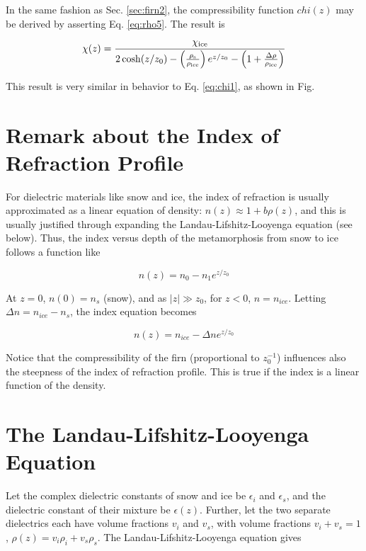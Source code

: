 \documentclass[12pt]{article}
\begin{document}
In the same fashion as Sec. \ref{sec:firn2}, the compressibility function $chi(z)$ may be derived by asserting Eq. \ref{eq:rho5}.  The result is

\begin{equation}
\chi(z) = \frac{\chi_{\rm ice}}{ 2\cosh(z/z_0) - \left(\frac{\rho_{\rm s}}{\rho_{\rm ice}}\right) e^{z/z_0} - \left(1+\frac{\Delta\rho}{\rho_{\rm ice}}\right)  }
\label{eq:chi4}
\end{equation}

This result is very similar in behavior to Eq. \ref{eq:chi1}, as shown in Fig.

\section{Remark about the Index of Refraction Profile}

For dielectric materials like snow and ice, the index of refraction is usually approximated as a linear equation of density: $n(z) \approx 1+b\rho(z)$, and this is usually justified through expanding the Landau-Lifshitz-Looyenga equation (see below).  Thus, the index versus depth of the metamorphosis from snow to ice follows a function like

\begin{equation}
n(z) = n_{0} - n_1 e^{z/z_0}
\end{equation}

At $z=0$, $n(0) = n_s$ (snow), and as $|z| \gg z_0$, for $z<0$, $n = n_{ice}$.  Letting $\Delta n = n_{ice} - n_{s}$, the index equation becomes

\begin{equation}
\boxed{
n(z) = n_{ice} - \Delta n e^{z/z_0}
}
\label{eq:n}
\end{equation}

Notice that the compressibility of the firn (proportional to $z_0^{-1}$) influences also the steepness of the index of refraction profile.  This is true if the index is a linear function of the density.

\section{The Landau-Lifshitz-Looyenga Equation}

Let the complex dielectric constants of snow and ice be $\epsilon_i$ and $\epsilon_s$, and the dielectric constant of their mixture be $\epsilon(z)$. Further, let the two separate dielectrics each have volume fractions $v_i$ and $v_s$, with volume fractions $v_i + v_s = 1$, $\rho(z) = v_i \rho_i + v_s \rho_s$.  The Landau-Lifshitz-Looyenga equation gives
\end{document}
